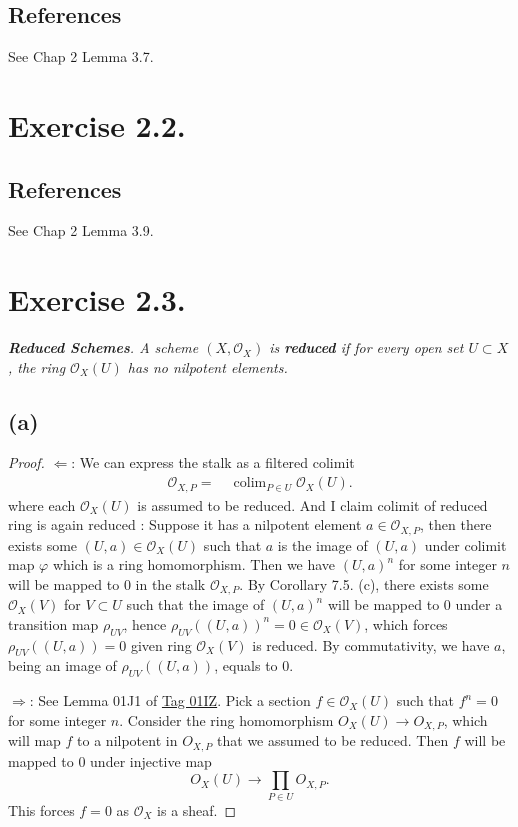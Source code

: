 \subsection{References}

See \cite{qing2006algebraic} Chap 2 Lemma 3.7. 

\section{Exercise 2.2.}

\subsection{References}

See \cite{qing2006algebraic} Chap 2 Lemma 3.9.

\section{Exercise 2.3.}
\textit{\textbf{Reduced Schemes}. A scheme $(X,\mathcal O_X)$ is \textbf{reduced} if for every open set $U\subset X$, the ring $\mathcal O_X(U)$ has no nilpotent elements.}

\subsection{(a)}

\begin{proof}
    $\Leftarrow$:
    We can express the stalk as a filtered colimit 
    \begin{align*}
        \mathcal O_{X,P}
        =&~ \operatorname{colim}_{P\in U}\mathcal O_X(U).
    \end{align*} where each $\mathcal O_X(U)$ is assumed to be reduced. 
    And I claim colimit of reduced ring is again reduced :
    Suppose it has a nilpotent element $a\in\mathcal O_{X,P}$, then there exists some $(U,a)\in \mathcal O_X(U)$ such that $a$ is the image of $(U,a)$ under colimit map $\varphi$ which is a ring homomorphism. Then we have $(U,a)^n$ for some integer $n$ will be mapped to $0$ in the stalk $\mathcal O_{X,P}$. By \cite{altman2013term} Corollary 7.5. (c), there exists some $\mathcal O_X(V)$ for $V\subset U$ such that the image of $(U,a)^n$ will be mapped to $0$ under a transition map $\rho_{UV}$, hence $\rho_{UV}((U,a))^n=0\in\mathcal O_X(V)$, which forces $\rho_{UV}((U,a))=0$ given ring $\mathcal O_X(V)$ is reduced. By commutativity, we have $a$, being an image of $\rho_{UV}((U,a))$, equals to $0$. 

    $\Rightarrow$: 
    See Lemma 01J1 of \href{https://stacks.math.columbia.edu/tag/01IZ}{Tag 01IZ}. 
    Pick a section $f\in\mathcal O_X(U)$ such that $f^n=0$ for some integer $n$. 
    Consider the ring homomorphism $O_X(U)\to O_{X,P}$, which will map $f$ to a nilpotent in $O_{X,P}$ that we assumed to be reduced. Then $f$ will be mapped to $0$ under injective map 
    \[O_X(U)\to \prod_{P\in U}O_{X,P}.\] This forces $f=0$ as $\mathcal O_X$ is a sheaf.
\end{proof} 

